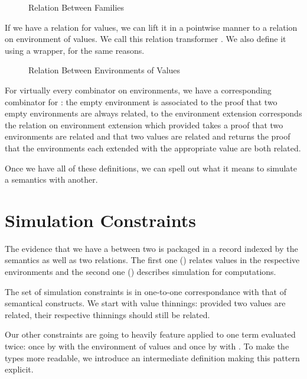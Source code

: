 \begin{figure}[h]
\caption{Relation Between  Families}
\end{figure}

If we have a relation for values, we can lift it in a pointwise manner to a relation
on environment of values. We call this relation transformer . We also define
it using a  wrapper, for the same reasons.

\begin{figure}[h]
\caption{Relation Between Environments of Values}
\end{figure}

For virtually every combinator on environments, we have a corresponding combinator
for : the empty environment  is associated to  the proof that
two empty environments are always related, to the environment extension  
corresponds the relation on environment extension  which provided takes a
proof that two environments are related and that two values are related and returns
the proof that the environments each extended with the appropriate value are both
related.

Once we have all of these definitions, we can spell out what it means to simulate
a semantics with another.

\section{Simulation Constraints}

The evidence that we have a  between two  is
packaged in a record indexed by the semantics as well as two relations.
The first one () relates values in the respective environments
and the second one () describes simulation for computations.


The set of simulation constraints is in one-to-one correspondance with that of
semantical constructs. We start with value thinnings: provided two values are
related, their respective thinnings should still be related.


Our other constraints are going to heavily feature  applied to one term evaluated
twice: once by  with the environment of values  and once by  with
. To make the types more readable, we introduce an intermediate definition 
making this pattern explicit.

